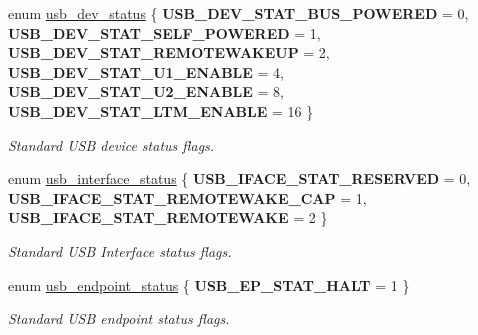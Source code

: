 \begin{DoxyCompactItemize}
\item 
\mbox{\label{group__usb__protocol__group_ga66f5695265beab24e3bc499d6ff881a2}} 
enum \hyperlink{group__usb__protocol__group_ga66f5695265beab24e3bc499d6ff881a2}{usb\+\_\+dev\+\_\+status} \{ \newline
{\bfseries U\+S\+B\+\_\+\+D\+E\+V\+\_\+\+S\+T\+A\+T\+\_\+\+B\+U\+S\+\_\+\+P\+O\+W\+E\+R\+ED} = 0, 
{\bfseries U\+S\+B\+\_\+\+D\+E\+V\+\_\+\+S\+T\+A\+T\+\_\+\+S\+E\+L\+F\+\_\+\+P\+O\+W\+E\+R\+ED} = 1, 
{\bfseries U\+S\+B\+\_\+\+D\+E\+V\+\_\+\+S\+T\+A\+T\+\_\+\+R\+E\+M\+O\+T\+E\+W\+A\+K\+E\+UP} = 2, 
{\bfseries U\+S\+B\+\_\+\+D\+E\+V\+\_\+\+S\+T\+A\+T\+\_\+\+U1\+\_\+\+E\+N\+A\+B\+LE} = 4, 
\newline
{\bfseries U\+S\+B\+\_\+\+D\+E\+V\+\_\+\+S\+T\+A\+T\+\_\+\+U2\+\_\+\+E\+N\+A\+B\+LE} = 8, 
{\bfseries U\+S\+B\+\_\+\+D\+E\+V\+\_\+\+S\+T\+A\+T\+\_\+\+L\+T\+M\+\_\+\+E\+N\+A\+B\+LE} = 16
 \}\begin{DoxyCompactList}\small\item\em Standard U\+SB device status flags. \end{DoxyCompactList}
\item 
\mbox{\label{group__usb__protocol__group_ga61c6d9f1bcc6112f394333fac658d627}} 
enum \hyperlink{group__usb__protocol__group_ga61c6d9f1bcc6112f394333fac658d627}{usb\+\_\+interface\+\_\+status} \{ {\bfseries U\+S\+B\+\_\+\+I\+F\+A\+C\+E\+\_\+\+S\+T\+A\+T\+\_\+\+R\+E\+S\+E\+R\+V\+ED} = 0, 
{\bfseries U\+S\+B\+\_\+\+I\+F\+A\+C\+E\+\_\+\+S\+T\+A\+T\+\_\+\+R\+E\+M\+O\+T\+E\+W\+A\+K\+E\+\_\+\+C\+AP} = 1, 
{\bfseries U\+S\+B\+\_\+\+I\+F\+A\+C\+E\+\_\+\+S\+T\+A\+T\+\_\+\+R\+E\+M\+O\+T\+E\+W\+A\+KE} = 2
 \}\begin{DoxyCompactList}\small\item\em Standard U\+SB Interface status flags. \end{DoxyCompactList}
\item 
\mbox{\label{group__usb__protocol__group_gaf926ff975fcda57f214001b51f15092d}} 
enum \hyperlink{group__usb__protocol__group_gaf926ff975fcda57f214001b51f15092d}{usb\+\_\+endpoint\+\_\+status} \{ {\bfseries U\+S\+B\+\_\+\+E\+P\+\_\+\+S\+T\+A\+T\+\_\+\+H\+A\+LT} = 1
 \}\begin{DoxyCompactList}\small\item\em Standard U\+SB endpoint status flags. \end{DoxyCompactList}

\end{DoxyCompactItemize}
